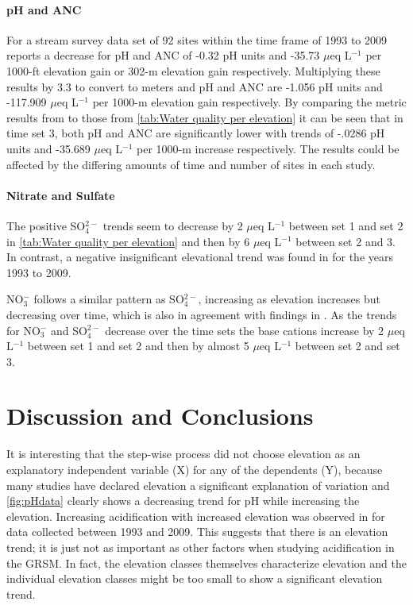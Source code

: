 \paragraph{pH and ANC}

For a stream survey data set of 92 sites within the time frame of 1993 to 2009 \citet{cai2013} reports a decrease for pH and ANC of -0.32 pH units and -35.73 $\mu$eq L$^{-1}$ per 1000-ft elevation gain or 302-m elevation gain respectively. 
Multiplying these results by 3.3 to convert to meters and pH and ANC are -1.056 pH units and -117.909 $\mu$eq L$^{-1}$ per 1000-m elevation gain respectively.
By comparing the metric results from \citet{cai2013} to those from \autoref{tab:Water quality per elevation} it can be seen that in time set 3,  both pH and ANC are significantly lower with trends of -.0286 pH units and -35.689 $\mu$eq L$^{-1}$  per 1000-m increase respectively.  
The results could be affected by the differing amounts of time and number of sites in each study.


\paragraph{Nitrate and Sulfate}

The positive SO$_4^{2-}$ trends seem to decrease by 2 $\mu$eq L$^{-1}$ between set 1 and set 2 in \autoref{tab:Water quality per elevation} and then by 6  $\mu$eq L$^{-1}$ between set 2 and 3.  
In contrast, a negative insignificant elevational trend was found in \citet{cai2013} for the years 1993 to 2009.  

NO$_3^-$ follows a similar pattern as SO$_4^{2-}$, increasing as elevation increases but decreasing over time, which is also in agreement with findings in \citet{weathers2006}.  
As the trends for  NO$_3^-$ and SO$_4^{2-}$ decrease over the time sets the base cations increase by 2 $\mu$eq L$^{-1}$ between set 1 and set 2 and then by almost 5 $\mu$eq L$^{-1}$ between set 2 and set 3.

\section{Discussion and Conclusions}

It is interesting that the step-wise process did not choose elevation as an explanatory independent variable (X) for any of the dependents (Y), because many studies have declared elevation a significant explanation of variation and \autoref{fig:pHdata} clearly shows a decreasing trend for pH while increasing the elevation. 
Increasing acidification with increased elevation was observed in \citet{cai2013} for data collected between 1993 and 2009.
This suggests that there is an elevation trend; it is just not as important as other factors when studying acidification in the GRSM.
In fact, the elevation classes themselves characterize elevation and the individual elevation classes might be too small to show a significant elevation trend.  

